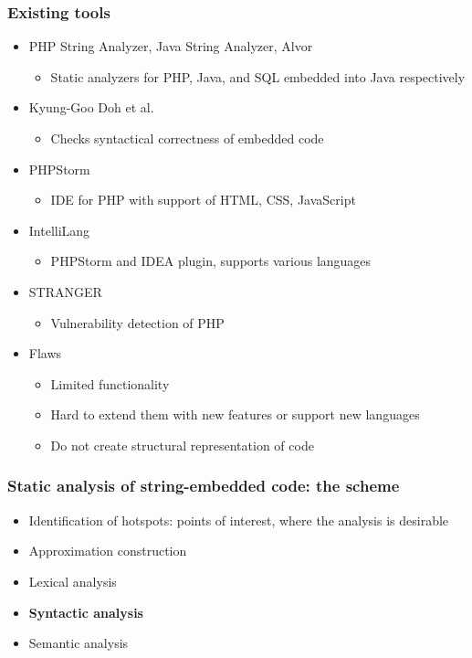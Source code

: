 \documentclass{beamer}
\begin{document}
\begin{frame}
  \transwipe[direction=90]
  \frametitle{Existing tools}
  \begin{itemize}
    \item PHP String Analyzer, Java String Analyzer, Alvor
    \begin{itemize}
      \item Static analyzers for PHP, Java, and SQL embedded into Java 
respectively
    \end{itemize}

    \item Kyung-Goo Doh et al.
    \begin{itemize}
      \item Checks syntactical correctness of embedded code
    \end{itemize}

    \item PHPStorm
    \begin{itemize}
      \item IDE for PHP with support of HTML, CSS, JavaScript
    \end{itemize}

    \item IntelliLang
    \begin{itemize}
      \item PHPStorm and IDEA plugin, supports various languages    
    \end{itemize} 

    \item STRANGER
    \begin{itemize}
      \item Vulnerability detection of PHP
    \end{itemize}
  \end{itemize}
  
  \begin{itemize}
    \item Flaws
    \begin{itemize}
      \item Limited functionality
      \item Hard to extend them with new features or support new languages
      \item Do not create structural representation of code
    \end{itemize}
  \end{itemize}
\end{frame}


\begin{frame}
  \transwipe[direction=90]
  \frametitle{Static analysis of string-embedded code: the scheme}
  \begin{itemize}
    \item Identification of hotspots: points of interest, where the analysis is 
desirable
    \item Approximation construction
    \item Lexical analysis
    \item \textbf{Syntactic analysis}
    \item Semantic analysis
  \end{itemize}
\end{frame}
\end{document}
